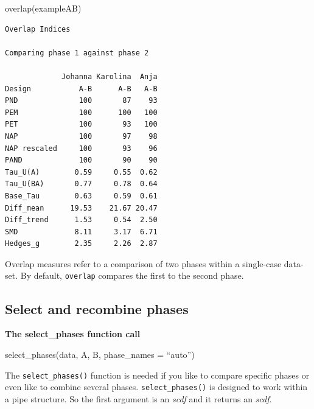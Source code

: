 \documentclass[
  letterpaper,
  DIV=11,
  numbers=noendperiod]{scrreprt}
\newenvironment{Shaded}{\begin{snugshade}}{\end{snugshade}}
\newcommand{\FunctionTok}[1]{\textcolor[rgb]{0.28,0.35,0.67}{#1}}
\newcommand{\NormalTok}[1]{\textcolor[rgb]{0.00,0.23,0.31}{#1}}
\begin{document}
\begin{Shaded}
\begin{Highlighting}[]
\FunctionTok{overlap}\NormalTok{(exampleAB)}
\end{Highlighting}
\end{Shaded}

\begin{verbatim}
Overlap Indices

Comparing phase 1 against phase 2 

             Johanna Karolina  Anja
Design           A-B      A-B   A-B
PND              100       87    93
PEM              100      100   100
PET              100       93   100
NAP              100       97    98
NAP rescaled     100       93    96
PAND             100       90    90
Tau_U(A)        0.59     0.55  0.62
Tau_U(BA)       0.77     0.78  0.64
Base_Tau        0.63     0.59  0.61
Diff_mean      19.53    21.67 20.47
Diff_trend      1.53     0.54  2.50
SMD             8.11     3.17  6.71
Hedges_g        2.35     2.26  2.87
\end{verbatim}

Overlap measures refer to a comparison of two phases within a
single-case data-set. By default, \texttt{overlap} compares the first to
the second phase.

\hypertarget{sec-select-phases}{%
\subsection{Select and recombine phases}\label{sec-select-phases}}

\begin{tcolorbox}[enhanced jigsaw, breakable, rightrule=.15mm, bottomrule=.15mm, arc=.35mm, colback=white, colframe=quarto-callout-tip-color-frame, opacityback=0, leftrule=.75mm, toprule=.15mm, left=2mm]
\begin{minipage}[t]{5.5mm}
\textcolor{quarto-callout-tip-color}{\faLightbulb}
\end{minipage}%
\begin{minipage}[t]{\textwidth - 5.5mm}

\textbf{The select\_phases function call}\vspace{2mm}

select\_phases(data, A, B, phase\_names = ``auto'')

\end{minipage}%
\end{tcolorbox}

The \texttt{select\_phases()} function is needed if you like to compare
specific phases or even like to combine several phases.
\texttt{select\_phases()} is designed to work within a pipe structure.
So the first argument is an \emph{scdf} and it returns an \emph{scdf}.
\end{document}
